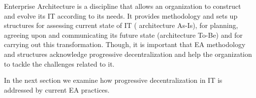 
Enterprise Architecture is a discipline  that allows an organization to construct and evolve its IT according to its needs. It provides  methodology and sets up structures  for assessing current state of IT ( architecture As-Is), for planning, agreeing upon and communicating its future state (architecture To-Be) and for carrying out this transformation. Though, it is important that  EA methodology and structures acknowledge progressive decentralization and help the organization to tackle the challenges related to it.

In the next section we examine how progressive decentralization in IT is addressed by current EA practices. 

